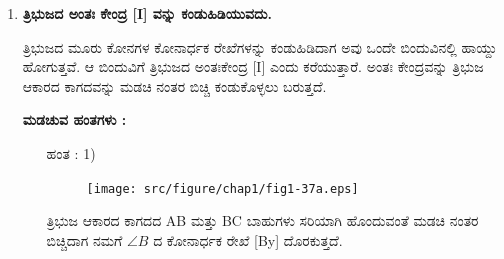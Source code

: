 \begin{enumerate}
    \noindent
 \textbf{ಮಡಚುವ ಹಂತಗಳು :}
 
 \begin{itemize}
 \item[ಹಂತ : 1)] 
 ~
 \begin{figure}[H]
\centering
\texttt{[image: src/figure/chap1/fig1-36a.eps]}
\end{figure}
 
ತ್ರಿಭುಜ ಆಕಾರದ ಒಂದು ಕಾಗದವನ್ನು [ABC] ತೆಗೆದುಕೊಂಡು. ಅದರ BC ಬಾಹುವಿನ ಮಧ್ಯ ಬಿಂದುವನ್ನು ಮಡಚಿ ಕಂಡುಕೊಳ್ಳಬೇಕು. ಅದು  `x' ಬಿಂದುವಾಗಿರಲಿ. 
 
 \item[ಹಂತ : 2)]
 ~
 \begin{figure}[H]
\centering
\texttt{[image: src/figure/chap1/fig1-36b.eps]}
\end{figure}
 
 ಈಗ ಬಾಹುವಿನ ಮಧ್ಯಬಿಂದು ಹಾಗೂ ವಿರುದ್ದವಿರುವ ಶೃಂಗಬಿಂದು (A) ವನ್ನು ಸೇರುವಂತೆ ಮಡಚಿ ಬಿಚ್ಚಬೇಕು. ಆಗ ಉಂಟಾಗುವ ರೇಖೆಗೆ (Ax) ತ್ರಿಭುಜದ ಮಧ್ಯರೇಖೆ ಎಂದು ಕರೆಯುತ್ತಾರೆ. 
 
 \item[ಹಂತ : 3)]
 ~
 \begin{figure}[H]
\centering
\texttt{[image: src/figure/chap1/fig1-36c.eps]}
\end{figure}
 
 ಇದರಂತೆ ಉಳಿದ ಎರಡು ಶೃಂಗ ಬಿಂದುಗಳಿಂದ (B ಮತ್ತು C) By ಮತ್ತು  Cz ಮಧ್ಯ ರೇಖೆಗಳನ್ನು ಮಡಚಿ ಪಡೆಯಬೇಕು. ಆ ಮೂರು ಮಧ್ಯ ರೇಖೆಗಳು ಒಂದೇ ಬಿಂದುವಿನಲ್ಲಿ  ಹಾಯ್ದು ಹೋಗುತ್ತವೆ. ಆ ಬಿಂದುವಿಗೆ ತ್ರಿಭುಜದ ಗುರತ್ವಕೇಂದ್ರ  [G] ಎಂದು ಕರೆಯುತ್ತಾರೆ. 
  \end{itemize}
 
 \item \textbf{ತ್ರಿಭುಜದ ಅಂತಃ ಕೇಂದ್ರ [I] ವನ್ನು ಕಂಡುಹಿಡಿಯುವದು. }  
 
 ತ್ರಿಭುಜದ ಮೂರು ಕೋನಗಳ ಕೋನಾರ್ಧಕ ರೇಖೆಗಳನ್ನು ಕಂಡುಹಿಡಿದಾಗ ಅವು ಒಂದೇ ಬಿಂದುವಿನಲ್ಲಿ ಹಾಯ್ದು ಹೋಗುತ್ತವೆ. ಆ ಬಿಂದುವಿಗೆ ತ್ರಿಭುಜದ ಅಂತಃ\break ಕೇಂದ್ರ [I]  ಎಂದು ಕರೆಯುತ್ತಾರೆ. ಅಂತಃ ಕೇಂದ್ರವನ್ನು ತ್ರಿಭುಜ ಆಕಾರದ ಕಾಗದ\break ವನ್ನು ಮಡಚಿ ನಂತರ ಬಿಚ್ಚಿ ಕಂಡುಕೊಳ್ಳಲು ಬರುತ್ತದೆ. 
 
 
 
    \noindent
 \textbf{ಮಡಚುವ ಹಂತಗಳು :}
  \begin{itemize}
 \item[ಹಂತ : 1)] 
 ~
 \begin{figure}[H]
\centering
\texttt{[image: src/figure/chap1/fig1-37a.eps]}
\end{figure}
  
 
 ತ್ರಿಭುಜ ಆಕಾರದ ಕಾಗದದ  AB ಮತ್ತು BC ಬಾಹುಗಳು ಸರಿಯಾಗಿ ಹೊಂದುವಂತೆ ಮಡಚಿ ನಂತರ ಬಿಚ್ಚಿದಾಗ ನಮಗೆ $\angle B$ ದ ಕೋನಾರ್ಧಕ ರೇಖೆ  [By] ದೊರಕುತ್ತದೆ. 
 

\end{itemize}
\end{enumerate}
